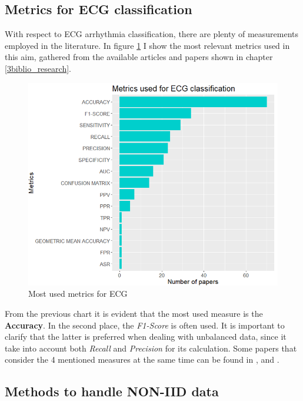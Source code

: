 \subsection{Metrics for ECG classification}\label{chap3metrics}

With respect to ECG arrhythmia classification, there are plenty of measurements employed in the literature. In figure \ref{fig:metrics_ECG} I show the most relevant metrics used in this aim, gathered from the available articles and papers shown in chapter \ref{3biblio_research}. 

 \begin{figure}[H]
\centering
\includegraphics[scale=0.48]{img/metrics_ECG.PNG}
\caption{Most used metrics for ECG}
\label{fig:metrics_ECG}
\end{figure}

From the previous chart it is evident that the most used measure is the \textbf{Accuracy}. In the second place, the \textit{F1-Score} is often used. It is important to clarify that the latter is preferred when dealing with unbalanced data, since it take into account both \textit{Recall} and \textit{Precision} for its calculation. Some papers that consider the 4 mentioned measures at the same time can be found in \cite{metrics_ecg1}, 
\cite{metrics_ecg2} and \cite{metrics_ecg3}.



\subsection{Methods to handle NON-IID data} \label{non_iid_handling}


